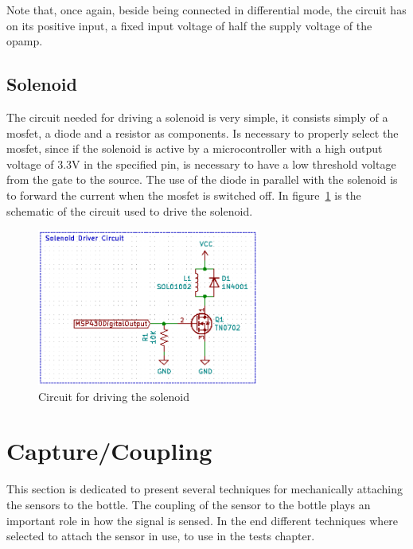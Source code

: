 Note that, once again, beside being connected in differential mode, the circuit has on its positive input, a fixed input voltage of half the supply voltage of the \acrshort{opamp}.
\subsection{Solenoid}
The circuit needed for driving a solenoid is very simple, it consists simply of a \acrshort{mosfet}, a diode and a resistor as components. Is necessary to properly select the \acrshort{mosfet}, since if the solenoid is active by a microcontroller with a high output voltage of 3.3V in the specified pin, is necessary to have a low threshold voltage from the gate to the source. The use of the diode in parallel with the solenoid is to forward the current when the \acrshort{mosfet} is switched off. In figure~\ref{fig:solenoidshc} is the schematic of the circuit used to drive the solenoid.
\begin{figure}[]
    \centering
    \includegraphics[width=0.65\textwidth]{Chapters/4CHP/Figures/SolenoidDriver.PNG}
    \caption{Circuit for driving the solenoid}
    \label{fig:solenoidshc}
\end{figure}
\section{Capture/Coupling}\label{sec:CaptureCoupling}
This section is dedicated to present several techniques for mechanically attaching the sensors to the bottle. The coupling of the sensor to the bottle plays an important role in how the signal is sensed. In the end different techniques where selected to attach the sensor in use, to use in the tests chapter.
